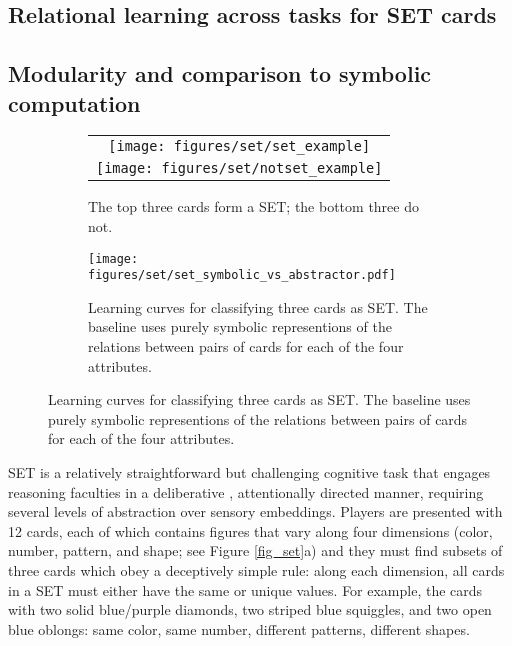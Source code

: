 \subsection{Relational learning across tasks for SET cards}
\label{ssec:set_exp}
\def\attr#1{{\small\texttt{#1}}}
\def\mattr#1{{\mbox{\footnotesize\texttt{#1}}}}

\subsection{Modularity and comparison to symbolic computation}

\begin{figure}
    \centering
    \begin{subfigure}[t]{0.45\textwidth}
        \centering
		\begin{tabular}{c}
		\texttt{[image: figures/set/set\_example]}\\
		\texttt{[image: figures/set/notset\_example]}\\[5pt]
		\end{tabular}
        \caption{The top three cards form a SET; the bottom three do not.}
    \end{subfigure} \hspace{\fill}
    \begin{subfigure}[t]{0.45\textwidth}
        \centering
		\texttt{[image: figures/set/set\_symbolic\_vs\_abstractor.pdf]}
        \caption{Learning curves for classifying three cards as SET. The baseline uses 
		purely symbolic representions of the relations between pairs of cards for each of the four attributes. 
     	}\label{fig:exp_set}
    \end{subfigure}
\end{figure}

SET is a relatively straightforward but challenging cognitive task that engages reasoning faculties in a deliberative
, attentionally directed manner, requiring several levels of abstraction over sensory embeddings. Players are
presented with 12 cards, each of which contains figures that vary along four dimensions (color, number, pattern, and
shape; see Figure \ref{fig_set}a) and they must find subsets of three cards which obey a deceptively simple rule: along each dimension, all cards in a SET must either have the same or unique values. 
For example, the cards with two solid blue/purple diamonds, two striped blue squiggles, and two open blue oblongs: same color, same number, different patterns, different shapes.

